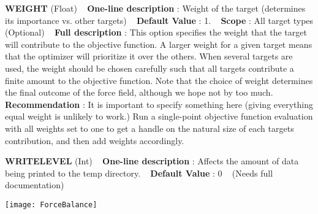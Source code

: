 \begin{DoxyItemize}
\item {\bfseries  W\+E\+I\+G\+HT } (Float) ~\newline
{\bfseries  One-\/line description }\+: Weight of the target (determines its importance vs. other targets) ~\newline
{\bfseries  Default Value }\+: 1. ~\newline
{\bfseries  Scope }\+: All target types (Optional) ~\newline
{\bfseries  Full description }\+: This option specifies the weight that the target will contribute to the objective function. A larger weight for a given target means that the optimizer will prioritize it over the others. When several targets are used, the weight should be chosen carefully such that all targets contribute a finite amount to the objective function. Note that the choice of weight determines the final outcome of the force field, although we hope not by too much. ~\newline
{\bfseries  Recommendation }\+: It is important to specify something here (giving everything equal weight is unlikely to work.) Run a single-\/point objective function evaluation with all weights set to one to get a handle on the natural size of each target\textquotesingle{}s contribution, and then add weights accordingly.\end{DoxyItemize}
\begin{DoxyItemize}
\item {\bfseries  W\+R\+I\+T\+E\+L\+E\+V\+EL } (Int) ~\newline
{\bfseries  One-\/line description }\+: Affects the amount of data being printed to the temp directory. ~\newline
{\bfseries  Default Value }\+: 0 ~\newline
(Needs full documentation)\end{DoxyItemize}

\begin{DoxyImage}
\texttt{[image: ForceBalance]}
\end{DoxyImage}
 